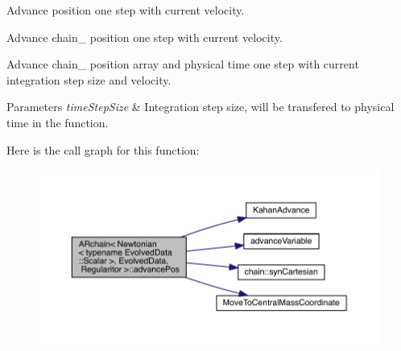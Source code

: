 Advance position one step with current velocity. 

Advance chain_ position one step with current velocity.

Advance chain_ position array and physical time one step with current integration step size and velocity.
\begin{DoxyParams}{Parameters}
{\em time\+Step\+Size} & Integration step size, will be transfered to physical time in the function. \\
\hline
\end{DoxyParams}
Here is the call graph for this function\+:\nopagebreak
\begin{figure}[H]
\begin{center}
\leavevmode
\includegraphics[width=350pt]{class_a_rchain_3_01_newtonian_3_01typename_01_evolved_data_1_1_scalar_01_4_00_01_evolved_data_00_01_regularitor_01_4_adffd5a74134d2a87e4f07908ea5beef4_cgraph}
\end{center}
\end{figure}
\mbox{\label{class_a_rchain_3_01_newtonian_3_01typename_01_evolved_data_1_1_scalar_01_4_00_01_evolved_data_00_01_regularitor_01_4_ad11d21617228157e755aa334d9c621a7}} 
